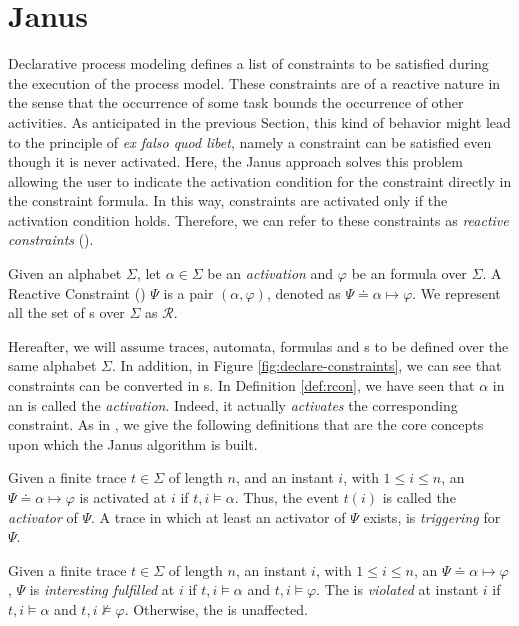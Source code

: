 \section{Janus}\label{sec:janus}
Declarative process modeling defines a list of \declare constraints to be satisfied during the execution of the process model. These constraints are of a reactive nature in the sense that the occurrence of some task bounds the occurrence of other activities. As anticipated in the previous Section, this kind of behavior might lead to the principle of \textit{ex falso quod libet}, namely a constraint can be satisfied even though it is never activated. Here, the Janus approach \citep{cecconi2018interestingness} solves this problem allowing the user to indicate the activation condition for the constraint directly in the constraint formula. In this way, constraints are activated only if the activation condition holds. Therefore, we can refer to these constraints as \textit{reactive constraints} (\rcon).
\begin{definition}\citep{cecconi2018interestingness}\label{def:rcon}
Given an alphabet $\Sigma$, let $\alpha \in \Sigma$ be an \emph{activation} and $\varphi$ be an \LTLp formula over $\Sigma$. A Reactive Constraint (\rcon) $\Psi$ is a pair $(\alpha, \varphi)$, denoted as $\Psi \doteq \alpha  \mapsto \varphi$. We represent all the set of \rcon s over $\Sigma$ as $\mathcal{R}$.
\end{definition}
Hereafter, we will assume traces, automata, \LTLp formulas and \rcon s to be defined over the same alphabet $\Sigma$. In addition, in Figure \ref{fig:declare-constraints}, we can see that \declare constraints can be converted in \rcon s. In Definition \ref{def:rcon}, we have seen that $\alpha$ in an \rcon\xspace is called the \emph{activation}. Indeed, it actually \emph{activates} the corresponding constraint. As in \citep{cecconi2018interestingness}, we give the following definitions that are the core concepts upon which the Janus algorithm is built.
\begin{definition}\citep{cecconi2018interestingness}\label{def:activator}
Given a finite trace $t \in \Sigma$ of length $n$, and an instant $i$, with $1 \le i \le n$, an \rcon\xspace $\Psi \doteq \alpha  \mapsto \varphi$ is activated at $i$ if $t,i \models \alpha$. Thus, the event $t(i)$ is called the \emph{activator} of $\Psi$. A trace in which at least an activator of $\Psi$ exists, is \emph{triggering} for $\Psi$.
\end{definition}

\begin{definition}\citep{cecconi2018interestingness}\label{def:interesting-fulfilment}
Given a finite trace $t \in \Sigma$ of length $n$, an instant $i$, with $1 \le i \le n$, an \rcon\xspace $\Psi \doteq \alpha  \mapsto \varphi$, $\Psi$ is \emph{interesting fulfilled} at $i$ if $t,i \models \alpha$ and $t,i \models \varphi$. The \rcon\xspace is \emph{violated} at instant $i$ if $t,i \models \alpha$ and $t,i \not\models \varphi$. Otherwise, the \rcon\xspace is unaffected.
\end{definition}

